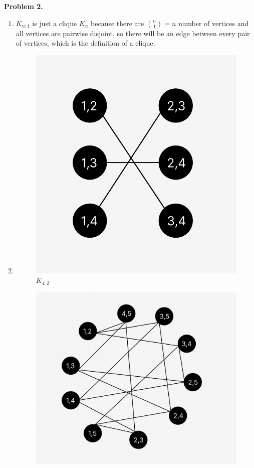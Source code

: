\documentclass{article}
\begin{document}
\textbf{Problem 2.}
\begin{enumerate}[label=(\alph*)]
    \item $K_{n:1}$ is just a clique $K_n$ because there are ${n\choose 1} = n$ number of vertices and all vertices are pairwise disjoint, so there will be an edge between every pair of vertices, which is the definition of a clique.
    \item \indent
    \begin{figure}[htb]
        \qquad
        \begin{minipage}{.4\textwidth}
            \centering
            {\includegraphics[scale=0.5]{K(4,2).png}}
            \qquad\qquad$K_{4:2}$\label{fig:1}
        \end{minipage}    
        \qquad
        \begin{minipage}{.4\textwidth}
            \centering
            {\includegraphics[scale=0.35]{K(5,2).png}}

\end{minipage}
\end{figure}
\end{enumerate}
\end{document}
